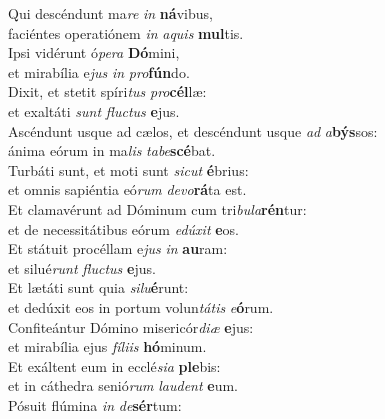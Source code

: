 \oddverse Qui descéndunt ma\textit{re} \textit{in} \textbf{ná}vibus,~\*\\
\oddverse faciéntes operatiónem \textit{in} \textit{a}\textit{quis} \textbf{mul}tis.\\
\evenverse Ipsi vidérunt ó\textit{pe}\textit{ra} \textbf{Dó}mini,~\*\\
\evenverse et mirabília e\textit{jus} \textit{in} \textit{pro}\textbf{fún}do.\\
\oddverse Dixit, et stetit spíri\textit{tus} \textit{pro}\textbf{cél}læ:~\*\\
\oddverse et exaltáti \textit{sunt} \textit{flu}\textit{ctus} \textbf{e}jus.\\
\evenverse Ascéndunt usque ad cælos, et descéndunt usque \textit{ad} \textit{a}\textbf{býs}sos:~\*\\
\evenverse ánima eórum in ma\textit{lis} \textit{ta}\textit{be}\textbf{scé}bat.\\
\oddverse Turbáti sunt, et moti sunt \textit{si}\textit{cut} \textbf{é}brius:~\*\\
\oddverse et omnis sapiéntia eó\textit{rum} \textit{de}\textit{vo}\textbf{rá}ta est.\\
\evenverse Et clamavérunt ad Dóminum cum tri\textit{bu}\textit{la}\textbf{rén}tur:~\*\\
\evenverse et de necessitátibus eórum \textit{e}\textit{dú}\textit{xit} \textbf{e}os.\\
\oddverse Et státuit procéllam e\textit{jus} \textit{in} \textbf{au}ram:~\*\\
\oddverse et silué\textit{runt} \textit{flu}\textit{ctus} \textbf{e}jus.\\
\evenverse Et lætáti sunt quia \textit{si}\textit{lu}\textbf{é}runt:~\*\\
\evenverse et dedúxit eos in portum volun\textit{tá}\textit{tis} \textit{e}\textbf{ó}rum.\\
\oddverse Confiteántur Dómino misericór\textit{di}\textit{æ} \textbf{e}jus:~\*\\
\oddverse et mirabília ejus \textit{fí}\textit{li}\textit{is} \textbf{hó}minum.\\
\evenverse Et exáltent eum in ecclé\textit{si}\textit{a} \textbf{ple}bis:~\*\\
\evenverse et in cáthedra senió\textit{rum} \textit{lau}\textit{dent} \textbf{e}um.\\
\oddverse Pósuit flúmina \textit{in} \textit{de}\textbf{sér}tum:~\*\\
